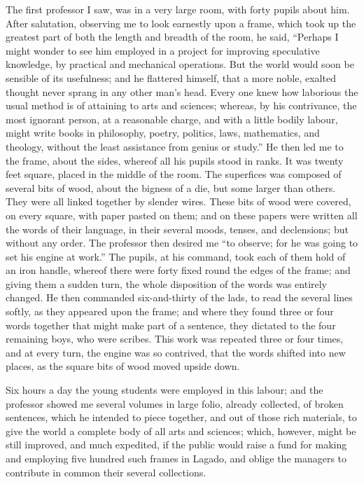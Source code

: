 \documentclass[12pt]{article}
\begin{document}
The first professor I saw, was in a very large room, with forty pupils about him.  After salutation, observing me to look earnestly upon a frame, which took up the greatest part of both the length and breadth of the room, he said, “Perhaps I might wonder to see him employed in a project for improving speculative knowledge, by practical and mechanical operations.  But the world would soon be sensible of its usefulness; and he flattered himself, that a more noble, exalted thought never sprang in any other man’s head.  Every one knew how laborious the usual method is of attaining to arts and sciences; whereas, by his contrivance, the most ignorant person, at a reasonable charge, and with a little bodily labour, might write books in philosophy, poetry, politics, laws, mathematics, and theology, without the least assistance from genius or study.”  He then led me to the frame, about the sides, whereof all his pupils stood in ranks.  It was twenty feet square, placed in the middle of the room.  The superfices was composed of several bits of wood, about the bigness of a die, but some larger than others.  They were all linked together by slender wires.  These bits of wood were covered, on every square, with paper pasted on them; and on these papers were written all the words of their language, in their several moods, tenses, and declensions; but without any order.  The professor then desired me “to observe; for he was going to set his engine at work.”  The pupils, at his command, took each of them hold of an iron handle, whereof there were forty fixed round the edges of the frame; and giving them a sudden turn, the whole disposition of the words was entirely changed.  He then commanded six-and-thirty of the lads, to read the several lines softly, as they appeared upon the frame; and where they found three or four words together that might make part of a sentence, they dictated to the four remaining boys, who were scribes.  This work was repeated three or four times, and at every turn, the engine was so contrived, that the words shifted into new places, as the square bits of wood moved upside down.

Six hours a day the young students were employed in this labour; and the professor showed me several volumes in large folio, already collected, of broken sentences, which he intended to piece together, and out of those rich materials, to give the world a complete body of all arts and sciences; which, however, might be still improved, and much expedited, if the public would raise a fund for making and employing five hundred such frames in Lagado, and oblige the managers to contribute in common their several collections.
\end{document}
